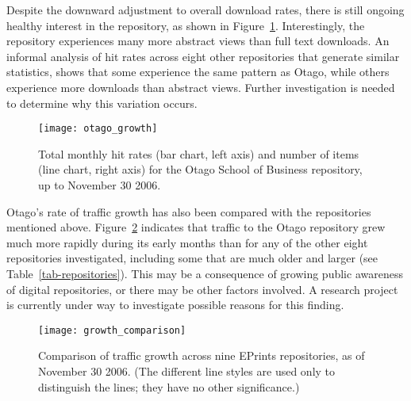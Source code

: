 \documentclass[12pt,pdftex,a4paper,titlepage]{article}
\begin{document}
Despite the downward adjustment to overall download rates, there is still ongoing healthy interest in the repository, as shown in Figure~\ref{fig-otago-growth}. Interestingly, the repository experiences many more abstract views than full text downloads. An informal analysis of hit rates across eight other repositories that generate similar statistics, shows that some experience the same pattern as Otago, while others experience more downloads than abstract views. Further investigation is needed to determine why this variation occurs.


\begin{figure}
	\centering
	\texttt{[image: otago\_growth]}
	\caption{Total monthly hit rates (bar chart, left axis) and number of items (line chart, right axis) for the Otago School of Business repository, up to November 30 2006.}
	\label{fig-otago-growth}
\end{figure}


Otago's rate of traffic growth has also been compared with the repositories mentioned above. Figure~\ref{fig-growth-comparison} indicates that traffic to the Otago repository grew much more rapidly during its early months than for any of the other eight repositories investigated, including some that are much older and larger (see Table~\ref{tab-repositories}). This may be a consequence of growing public awareness of digital repositories, or there may be other factors involved. A research project is currently under way to investigate possible reasons for this finding.


\begin{figure}
	\centering
	\texttt{[image: growth\_comparison]}
	\caption{Comparison of traffic growth across nine EPrints repositories, as of November 30 2006. (The different line styles are used only to distinguish the lines; they have no other significance.)}
	\label{fig-growth-comparison}
\end{figure}
\end{document}
